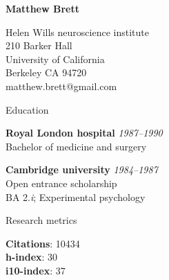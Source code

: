 \documentclass{cv}
\newcommand{\PlaceDate}[2]{{\bf #1} \hfill {\em #2} \\}
\newcommand{\PlaceDateNote}[3]{{\bf #1} \hfill {\em #2} \\#3}
\begin{document}
\nocite{*}

{\huge \bf Matthew Brett}

Helen Wills neuroscience institute \\
210 Barker Hall \\
University of California \\
Berkeley CA 94720 \\
matthew.brett@gmail.com

\begin{cvSection}{Education}

\PlaceDate{Royal London hospital}{1987--1990 }
Bachelor of medicine and surgery

\PlaceDateNote{Cambridge university}{1984--1987 }{
Open entrance scholarship \\
BA 2.{\em i}; Experimental psychology}

\end{cvSection}

\begin{cvSection}{Research metrics}

{\bf Citations}: 10434 \\
{\bf h-index}: 30 \\
{\bf i10-index}: 37

\end{cvSection}
\end{document}
